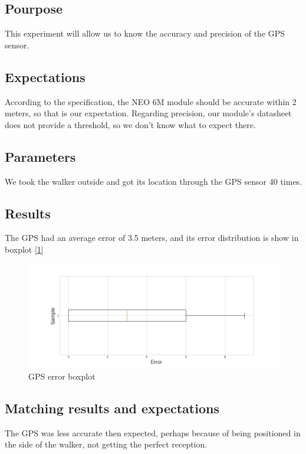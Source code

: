 	\subsection{Pourpose}
		This experiment will allow us to know the accuracy and precision of the GPS sensor.
	\subsection{Expectations}
		According to the specification, the NEO 6M module should be accurate within 2 meters, so that is our expectation. Regarding precision, our module's datasheet does not provide a threshold, so we don't know what to expect there.

	\subsection{Parameters}
		We took the walker outside and got its location through the GPS sensor 40 times.

	\subsection{Results}
		The GPS had an average error of 3.5 meters, and its error distribution is show in boxplot [\ref{fig:gps_plot}]

		\begin{figure}[h]
			\centering
			\includegraphics[width=1.1\linewidth]{gfx/gps_boxplot_error}
			\caption{GPS error boxplot}
			\label{fig:gps_plot}
		\end{figure}

	\subsection{Matching results and expectations}
		The GPS was less accurate then expected, perhaps because of being positioned in the side of the walker, not getting the perfect reception.

